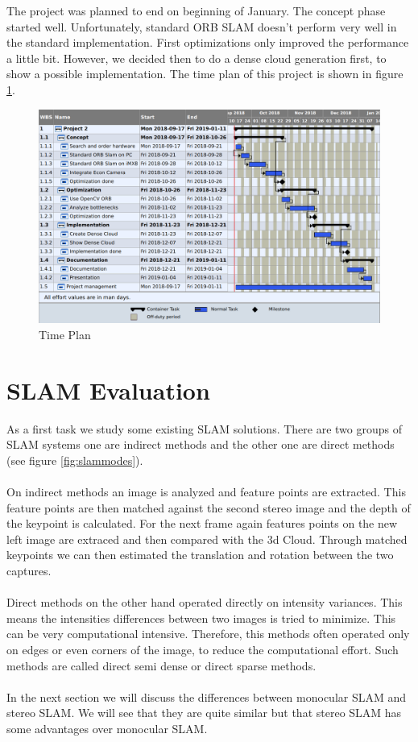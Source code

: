 \documentclass[11pt,a4paper,titlepage,oneside]{report}
\begin{document}
The project was planned to end on beginning of January. The concept phase started well. Unfortunately, standard ORB SLAM doesn't perform very well in the standard implementation. First optimizations only improved the performance a little bit. However, we decided then to do a dense cloud generation first, to show a possible implementation. The time plan of this project is shown in figure \ref{fig:timeplan}.
\begin{figure}[H]
	\includegraphics[width=1.0\textwidth]{img/timeplan.png}
	\caption{Time Plan}\label{fig:timeplan}
\end{figure}

\chapter{SLAM Evaluation}

As a first task we study some existing SLAM solutions. There are two groups of SLAM systems one are indirect methods and the other one are direct methods (see figure \ref{fig:slammodes}).\\\\
On indirect methods an image is analyzed and feature points are extracted. This feature points are then matched against the second stereo image and the depth of the keypoint is calculated. For the next frame again features points on the new left image are extraced and then compared with the 3d Cloud. Through matched keypoints we can then estimated the translation and rotation between the two captures.\\\\
Direct methods on the other hand operated directly on intensity variances. This means the intensities differences between two images is tried to minimize. This can be very computational intensive. Therefore, this methods often operated only on edges or even corners of the image, to reduce the computational effort. Such methods are called direct semi dense or direct sparse methods.\\\\
In the next section we will discuss the differences between monocular SLAM and stereo SLAM. We will see that they are quite similar but that stereo SLAM has some advantages over monocular SLAM.
\end{document}
